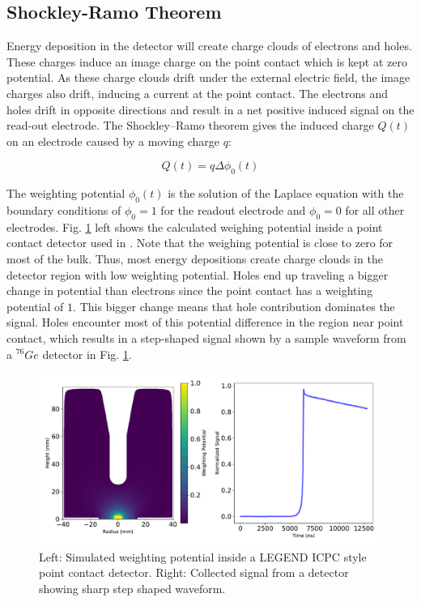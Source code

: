 \subsection{Shockley-Ramo Theorem}
Energy deposition in the detector will create charge clouds of electrons and holes. These charges induce an image charge on the point contact which is kept at zero potential. As these charge clouds drift under the external electric field, the image charges also drift, inducing a current at the point contact. The electrons and holes drift in opposite directions and result in a net positive induced signal on the read-out electrode. The Shockley–Ramo theorem gives the induced charge $Q(t)$ on an electrode caused by a moving charge $q$:

\begin{equation}\label{wp_eq}
Q(t)=q\Delta \phi_0(t)
\end{equation}

The weighting potential $\phi_0(t)$ is the solution of the Laplace equation with the boundary conditions of $\phi_0=1$ for the readout electrode and $\phi_0=0$ for all other electrodes. Fig. \ref{fig:wp_signal} left shows the calculated weighing potential inside a point contact detector used in {\MJD}. Note that the weighing potential is close to zero for most of the bulk. Thus, most energy depositions create charge clouds in the detector region with low weighting potential. Holes end up traveling a bigger change in potential than electrons since the point contact has a weighting potential of $1$. This bigger change means that hole contribution dominates the signal. Holes encounter most of this potential difference in the region near point contact, which results in a step-shaped signal shown by a sample waveform from a ${}^{76}Ge$ detector in Fig. \ref{fig:wp_signal}.

  \begin{figure}[htb]
  \centering
  \includegraphics[trim=0 0.5cm 0 0,clip,width=\linewidth]{ch2/figs/wp_det.pdf}
  \caption{Left: Simulated weighting potential inside a LEGEND ICPC style point contact detector. Right: Collected signal from a detector showing sharp step shaped waveform.}
    \label{fig:wp_signal}
  \end{figure}

